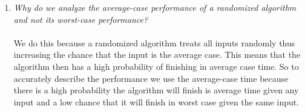 \documentclass[12pt]{article}
\begin{document}
\begin{enumerate}
	\item \textit{Why do we analyze the average-case performance of a randomized algorithm and not its worst-case performance?}
	\\\\
	We do this because a randomized algorithm treats all inputs randomly thus increasing the chance that the input is the average case. This means that the algorithm then has a high probability of finishing in average case time. So to accurately describe the performance we use the average-case time because there is a high probability the algorithm will finish is average time given any input and a low chance that it will finish in worst case given the same input.
	
		
\end{enumerate}
\end{document}
